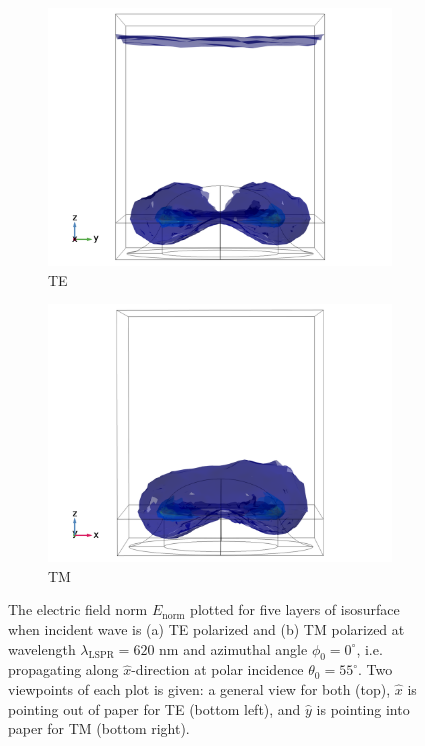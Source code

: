 \begin{figure}[h!]
\begin{subfigure}{0.5\textwidth}
    \end{subfigure}
    
    \begin{subfigure}{0.5\textwidth}
        \centering
        \includegraphics[width=\linewidth, trim=0.6cm 0 1.6cm 0, clip]{figures/ch4/S5A/FieldDistribution/isosurface/Sample5A_nomE_wl620_phi0_TE_xoutofpaper.png}
        \caption{TE}
    \end{subfigure}
    \begin{subfigure}{0.5\textwidth}
        \centering
        \includegraphics[width=\linewidth, trim=0.6cm 0 1.6cm 0, clip]{figures/ch4/S5A/FieldDistribution/isosurface/Sample5A_nomE_wl620_phi0_TM_yintopaper.png}
        \caption{TM}
    \end{subfigure}
    \caption{The electric field norm $E_\text{norm}$ plotted for five layers of isosurface when incident wave is (a) TE polarized and (b) TM polarized at wavelength $\lambda_{\text{LSPR}}=620$ nm and azimuthal angle $\phi_0=0^\circ$, i.e. propagating along $\hat{x}$-direction at polar incidence $\theta_0=55^\circ$. Two viewpoints of each plot is given: a general view for both (top), $\hat{x}$ is pointing out of paper for TE (bottom left), and $\hat{y}$ is pointing into paper for TM (bottom right).}
    \label{fig:S5A_normE_isosurface_LSPR}
\end{figure}


